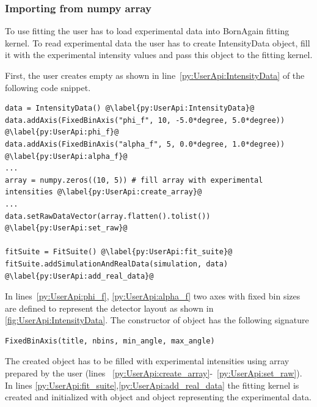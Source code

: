 


\subsubsection{Importing from numpy array}

To use fitting the user has to load experimental data into BornAgain fitting kernel.
To read experimental data the user has to create
IntensityData object, fill it with the experimental  intensity values and pass
this object to the fitting kernel.

First, the user creates empty  as shown
in line~\ref{py:UserApi:IntensityData} of the following code snippet.
\begin{lstlisting}
data = IntensityData() @\label{py:UserApi:IntensityData}@
data.addAxis(FixedBinAxis("phi_f", 10, -5.0*degree, 5.0*degree)) @\label{py:UserApi:phi_f}@
data.addAxis(FixedBinAxis("alpha_f", 5, 0.0*degree, 1.0*degree)) @\label{py:UserApi:alpha_f}@
...
array = numpy.zeros((10, 5)) # fill array with experimental intensities @\label{py:UserApi:create_array}@
...
data.setRawDataVector(array.flatten().tolist()) @\label{py:UserApi:set_raw}@

fitSuite = FitSuite() @\label{py:UserApi:fit_suite}@
fitSuite.addSimulationAndRealData(simulation, data) @\label{py:UserApi:add_real_data}@
\end{lstlisting}

In lines~\ref{py:UserApi:phi_f}, \ref{py:UserApi:alpha_f} two axes with fixed bin sizes
are defined to represent the detector layout as shown in \cref{fig:UserApi:IntensityData}.
The constructor of  object has the following signature

\begin{lstlisting}
FixedBinAxis(title, nbins, min_angle, max_angle)
\end{lstlisting}

The created  object has to be filled with experimental intensities
using  array prepared by the user (lines ~\ref{py:UserApi:create_array}-~\ref{py:UserApi:set_raw}). In lines \ref{py:UserApi:fit_suite},\ref{py:UserApi:add_real_data} the fitting kernel is created and initialized with  object and
 object representing the experimental data.



